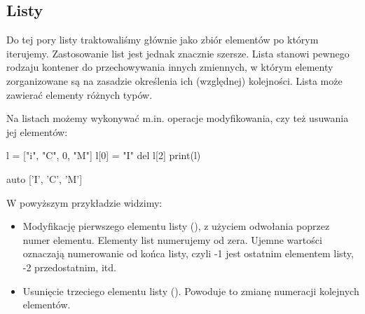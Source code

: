 % 
% 
% 
% 

\subsection{Listy}

Do tej pory listy traktowaliśmy głównie jako zbiór elementów po którym iterujemy. Zastosowanie list jest jednak znacznie szersze.
Lista stanowi pewnego rodzaju kontener do przechowywania innych zmiennych, w którym elementy zorganizowane są na zasadzie określenia ich (względnej) kolejności.
Lista może zawierać elementy różnych typów.

Na listach możemy wykonywać m.in. operacje modyfikowania, czy też usuwania jej elementów:

\begin{CodeFrame}[python]{0.50\textwidth}
l = ["i", "C", 0, "M"]
l[0] = "I"
del l[2]
print(l)
\end{CodeFrame}
\begin{CodeFrame}{auto}
['I', 'C', 'M']
\end{CodeFrame}

\noindent W powyższym przykładzie widzimy:
\begin{itemize}
\item Modyfikację pierwszego elementu listy (), z użyciem odwołania poprzez numer elementu.
      Elementy list numerujemy od zera. Ujemne wartości oznaczają numerowanie od końca listy, czyli -1 jest ostatnim elementem listy, -2 przedostatnim, itd.
\item Usunięcie trzeciego elementu listy (). Powoduje to zmianę numeracji kolejnych elementów.
\end{itemize}

